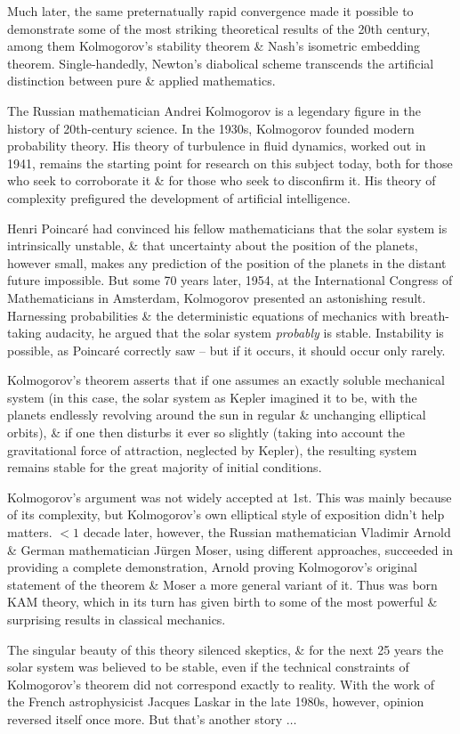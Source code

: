 \documentclass{article}
\begin{document}
\begin{enumerate}
	Much later, the same preternatually rapid convergence made it possible to demonstrate some of the most striking theoretical results of the 20th century, among them {\sc Kolmogorov}'s stability theorem \& {\sc Nash}'s isometric embedding theorem. Single-handedly, {\sc Newton}'s diabolical scheme transcends the artificial distinction between pure \& applied mathematics.

	The Russian mathematician {\sc Andrei Kolmogorov} is a legendary figure in the history of 20th-century science. In the 1930s, {\sc Kolmogorov} founded modern probability theory. His theory of turbulence in fluid dynamics, worked out in 1941, remains the starting point for research on this subject today, both for those who seek to corroborate it \& for those who seek to disconfirm it. His theory of complexity prefigured the development of artificial intelligence.

	{\sc Henri Poincar\'e} had convinced his fellow mathematicians that the solar system is intrinsically unstable, \& that uncertainty about the position of the planets, however small, makes any prediction of the position of the planets in the distant future impossible. But some 70 years later, 1954, at the International Congress of Mathematicians in Amsterdam, {\sc Kolmogorov} presented an astonishing result. Harnessing probabilities \& the deterministic equations of mechanics with breath-taking audacity, he argued that the solar system {\it probably} is stable. Instability is possible, as {\sc Poincar\'e} correctly saw -- but if it occurs, it should occur only rarely.

	{\sc Kolmogorov}'s theorem asserts that if one assumes an exactly soluble mechanical system (in this case, the solar system as {\sc Kepler} imagined it to be, with the planets endlessly revolving around the sun in regular \& unchanging elliptical orbits), \& if one then disturbs it ever so slightly (taking into account the gravitational force of attraction, neglected by {\sc Kepler}), the resulting system remains stable for the great majority of initial conditions.

	{\sc Kolmogorov}'s argument was not widely accepted at 1st. This was mainly because of its complexity, but {\sc Kolmogorov}'s own elliptical style of exposition didn't help matters. $< 1$ decade later, however, the Russian mathematician {\sc Vladimir Arnold} \& German mathematician {\sc J\"urgen Moser}, using different approaches, succeeded in providing a complete demonstration, {\sc Arnold} proving {\sc Kolmogorov}'s original statement of the theorem \& {\sc Moser} a more general variant of it. Thus was born KAM theory, which in its turn has given birth to some of the most powerful \& surprising results in classical mechanics.

	The singular beauty of this theory silenced skeptics, \& for the next 25 years the solar system was believed to be stable, even if the technical constraints of {\sc Kolmogorov}'s theorem did not correspond exactly to reality. With the work of the French astrophysicist {\sc Jacques Laskar} in the late 1980s, however, opinion reversed itself once more. But that's another story $\ldots$
\end{enumerate}
\end{document}
